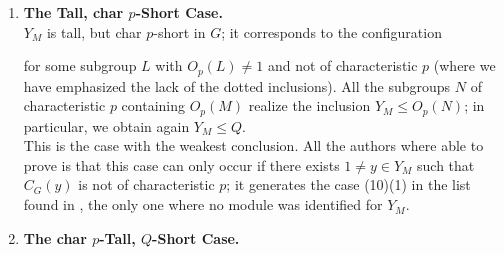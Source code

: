 \documentclass{amsart}
\numberwithin{equation}{section}
\theoremstyle{definition}
\theoremstyle{subresult}
\theoremstyle{caseresult}
\newcommand{\<}{\langle}
\renewcommand{\>}{\rangle}
\begin{document}
\begin{enumerate}
\begin{enumerate}[label=(Asym: \alph*), itemindent=0.5cm]
                The reasoning here resembles that of the symmetric case. One always looks at pairs of conjugates of $Y_M$, say $(Y_1,Y_2)$, but needs then to replace them with larger elementary abelian $p$-subgroups $(V_1,V_2)$. In detail, one shows that it is possible to find subgroups $L_1, L_2$, called \emph{indicators} (see \cite[Definition 2.19]{Meier-Stell-Stroth:2012}), such that, for $V_i := \< Y_i^{L_i} \>$, one has
		\[
		V_1V_2 \le L_1 \cap L_2 \quad \text{and} \quad 1 \ne [V_1,V_2] \le V_1 \cap V_2;
		\]
		hence the pair $(V_1,V_2)$ plays the role that $(Y_1,Y_2)$ had in the symmetric case.	One then studies the actions of the $L_i$s on the $V_i$s to deduce information about the action of $N_G(Y_i)$ on $Y_i$; in particular, the groups $V_i$ allow to find offenders on the $Y_i$s, but this requires a very technical argument, not as simple as the one used in the symmetric case. Here a strong dual offender is found, hence the main tool becomes \cite[Theorem C.27]{Meier-Stell-Stroth:2012}.
				\item {\bf The Tall, char $p$-Short Case.}\\
					 $Y_M$ is tall, but char $p$-short in $G$; it corresponds to the configuration 
					 \begin{center}
                    \end{center}
                for some subgroup $L$ with $O_p(L) \ne 1$ and not of characteristic $p$ (where we have emphasized the lack of the dotted inclusions). All the subgroups $N$ of characteristic $p$ containing $O_p(M)$ realize the inclusion $Y_M \le O_p(N)$; in particular, we obtain again $Y_M \le Q$.\\
                This is the case with the weakest conclusion. All the authors where able to prove is that this case can only occur if there exists $1 \ne y \in Y_M$ such that $C_G(y)$ is not of characteristic $p$; it generates the case (10)(1) in the list found in \cite[Theorem A]{Meier-Stell-Stroth:2012}, the only one where no module was identified for $Y_M$.
				\item {\bf The char $p$-Tall, $Q$-Short Case.}\\

\end{enumerate}
\end{enumerate}
\end{document}

